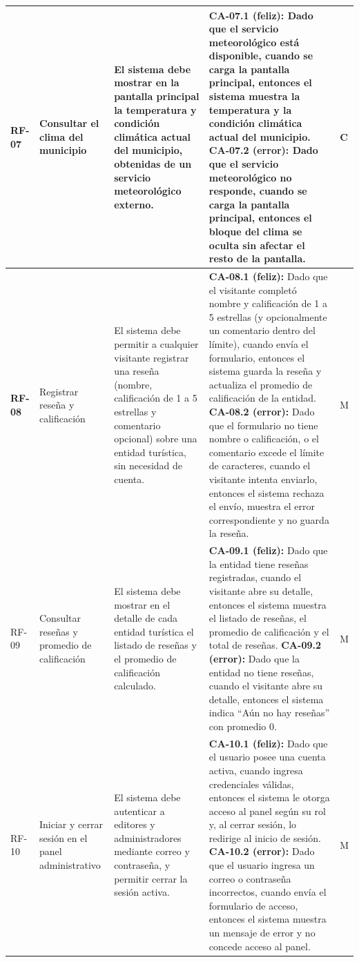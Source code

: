 \begin{longtable}{|>{\bfseries}p{1.2cm}|p{2.3cm}|p{3.4cm}|p{5.9cm}|>{\centering\arraybackslash}p{1.1cm}|}
RF-07 & Consultar el clima del municipio & El sistema debe mostrar en la pantalla principal la temperatura y condición climática actual del municipio, obtenidas de un servicio meteorológico externo. &
\textbf{CA-07.1 (feliz):} Dado que el servicio meteorológico está disponible, cuando se carga la pantalla principal, entonces el sistema muestra la temperatura y la condición climática actual del municipio.
\newline
\textbf{CA-07.2 (error):} Dado que el servicio meteorológico no responde, cuando se carga la pantalla principal, entonces el bloque del clima se oculta sin afectar el resto de la pantalla. & C \\ \hline

RF-08 & Registrar reseña y calificación & El sistema debe permitir a cualquier visitante registrar una reseña (nombre, calificación de 1 a 5 estrellas y comentario opcional) sobre una entidad turística, sin necesidad de cuenta. &
\textbf{CA-08.1 (feliz):} Dado que el visitante completó nombre y calificación de 1 a 5 estrellas (y opcionalmente un comentario dentro del límite), cuando envía el formulario, entonces el sistema guarda la reseña y actualiza el promedio de calificación de la entidad.
\newline
\textbf{CA-08.2 (error):} Dado que el formulario no tiene nombre o calificación, o el comentario excede el límite de caracteres, cuando el visitante intenta enviarlo, entonces el sistema rechaza el envío, muestra el error correspondiente y no guarda la reseña. & M \\ \hline

RF-09 & Consultar reseñas y promedio de calificación & El sistema debe mostrar en el detalle de cada entidad turística el listado de reseñas y el promedio de calificación calculado. &
\textbf{CA-09.1 (feliz):} Dado que la entidad tiene reseñas registradas, cuando el visitante abre su detalle, entonces el sistema muestra el listado de reseñas, el promedio de calificación y el total de reseñas.
\newline
\textbf{CA-09.2 (error):} Dado que la entidad no tiene reseñas, cuando el visitante abre su detalle, entonces el sistema indica ``Aún no hay reseñas'' con promedio 0. & M \\ \hline

RF-10 & Iniciar y cerrar sesión en el panel administrativo & El sistema debe autenticar a editores y administradores mediante correo y contraseña, y permitir cerrar la sesión activa. &
\textbf{CA-10.1 (feliz):} Dado que el usuario posee una cuenta activa, cuando ingresa credenciales válidas, entonces el sistema le otorga acceso al panel según su rol y, al cerrar sesión, lo redirige al inicio de sesión.
\newline
\textbf{CA-10.2 (error):} Dado que el usuario ingresa un correo o contraseña incorrectos, cuando envía el formulario de acceso, entonces el sistema muestra un mensaje de error y no concede acceso al panel. & M \\ \hline


\end{longtable}
